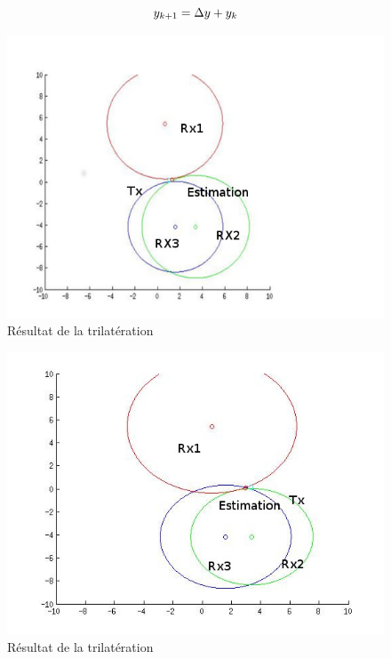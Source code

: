 \documentclass[10pt,a4paper]{article}
\begin{document}
\begin{equation}
	\centering
	\label{ny}
	y_{k+1} = \Delta y + y_k
\end{equation}

\begin{figure}[h]
\centering
\includegraphics[scale = 0.5]{p1b}
\caption{Résultat de la trilatération}
\end{figure}

\begin{figure}[h]
\centering
\includegraphics[scale = 0.5]{p6b}
\caption{Résultat de la trilatération}
\end{figure}
\end{document}
